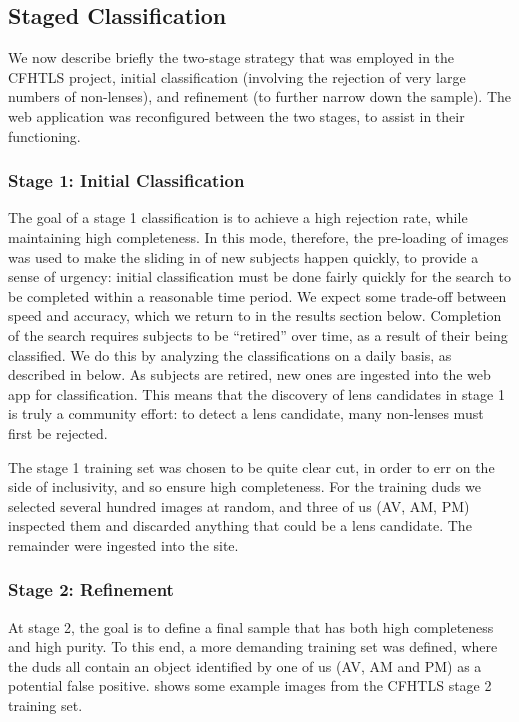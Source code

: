 \documentclass[useAMS,usenatbib,a4paper]{mn2e}
\begin{document}

\subsection{Staged Classification}
\label{sec:design:stages}

We now describe briefly the two-stage strategy that was employed in the CFHTLS
project, initial classification (involving the rejection of very large numbers
of non-lenses), and refinement (to further narrow down the sample). The web
application was reconfigured between the two stages, to assist in their
functioning.

\subsubsection{Stage 1: Initial Classification}

The goal of a stage 1 classification is to achieve a high rejection rate,
while maintaining high completeness.  In this mode, therefore, the pre-loading
of images was used to make the sliding in of new subjects happen quickly, to
provide a sense of urgency: initial classification must be done fairly
quickly for the search to be completed within a reasonable time period.  We
expect some trade-off between speed and accuracy, which we return to in the
results section below. Completion of the search requires subjects to be
``retired'' over time, as a result of their being classified. We do this by
analyzing the classifications on a daily basis, as described in
 below. As subjects are retired, new ones are ingested into
the web app for classification. This means that the discovery of lens
candidates in stage 1 is truly a community effort: to detect a lens candidate,
many non-lenses must first be rejected.

The stage 1 training set was chosen to be quite clear cut, in order to err on
the side of inclusivity, and so ensure high completeness. For the training
duds we selected several hundred images at random, and three of us (AV, AM,
PM) inspected them and discarded anything that could be a lens candidate. The
remainder were ingested into the site.


\subsubsection{Stage 2: Refinement}

At stage 2, the goal is to define a final sample that has both high
completeness and high purity. To this end, a more demanding training set was
defined, where the duds all contain an object identified by one of us (AV, AM
and PM) as a potential false positive.  shows some
example images from the CFHTLS stage 2 training set. 
\end{document}
